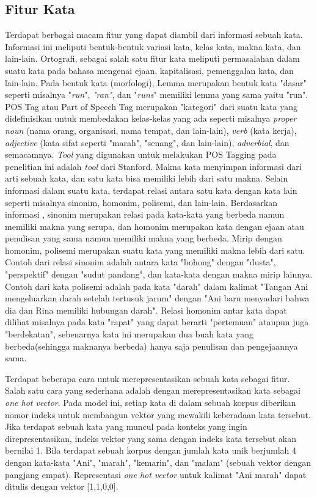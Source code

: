 \subsection{Fitur Kata}
Terdapat berbagai macam fitur yang dapat diambil dari informasi sebuah kata. Informasi ini meliputi bentuk-bentuk variasi kata, kelas kata, makna kata, dan lain-lain. Ortografi, sebagai salah satu fitur kata meliputi permasalahan dalam suatu kata pada bahasa mengenai ejaan, kapitalisasi, pemenggalan kata, dan lain-lain. Pada bentuk kata (morfologi), Lemma merupakan bentuk kata "dasar" seperti misalnya "\textit{run}", \textit{"ran"}, dan "\textit{runs}" memiliki lemma yang sama yaitu "run". POS Tag atau Part of Speech Tag merupakan "kategori" dari suatu kata yang didefinisikan untuk membedakan kelas-kelas yang ada seperti misalnya \textit{proper noun} (nama orang, organisasi, nama tempat, dan lain-lain), \textit{verb} (kata kerja), \textit{adjective} (kata sifat seperti "marah", "senang", dan lain-lain), \textit{adverbial}, dan semacamnya. \textit{Tool} yang digunakan untuk melakukan POS Tagging pada penelitian ini adalah \textit{tool} dari Stanford. Makna kata menyimpan informasi dari arti sebuah kata, dan satu kata bisa memiliki lebih dari satu makna. Selain informasi dalam suatu kata, terdapat relasi antara satu kata dengan kata lain seperti misalnya sinonim, homonim, polisemi, dan lain-lain. Berdasarkan informasi \citep{sheeba2013unsupervised}, sinonim merupakan relasi pada kata-kata yang berbeda namun memiliki makna yang serupa, dan homonim merupakan kata dengan ejaan atau penulisan yang sama namun memiliki makna yang berbeda. Mirip dengan homonim, polisemi merupakan suatu kata yang memiliki makna lebih dari satu. Contoh dari relasi sinonim adalah antara kata "bohong" dengan "dusta", "perspektif" dengan "sudut pandang", dan kata-kata dengan makna mirip lainnya. Contoh dari kata polisemi adalah pada kata "darah" dalam kalimat "Tangan Ani mengeluarkan darah setelah tertusuk jarum" dengan "Ani baru menyadari bahwa dia dan Rina memiliki hubungan darah". Relasi homonim antar kata dapat dilihat misalnya pada kata "rapat" yang dapat berarti "pertemuan" ataupun juga "berdekatan", sebenarnya kata ini merupakan dua buah kata yang berbeda(sehingga maknanya berbeda) hanya saja penulisan dan pengejaannya sama.

Terdapat beberapa cara untuk merepresentasikan sebuah kata sebagai fitur. Salah satu cara yang sederhana adalah dengan merepresentasikan kata sebagai \textit{one hot vector}. Pada model ini, setiap kata di dalam sebuah korpus diberikan nomor indeks untuk membangun vektor yang mewakili keberadaan kata tersebut. Jika terdapat sebuah kata yang muncul pada konteks yang ingin direpresentasikan, indeks vektor yang sama dengan indeks kata tersebut akan bernilai 1. Bila terdapat sebuah korpus dengan jumlah kata unik berjumlah 4 dengan kata-kata "Ani", "marah", "kemarin", dan "malam" (sebuah vektor dengan pangjang empat). Representasi \textit{one hot vector} untuk kalimat "Ani marah" dapat ditulis dengan vektor [1,1,0,0].

